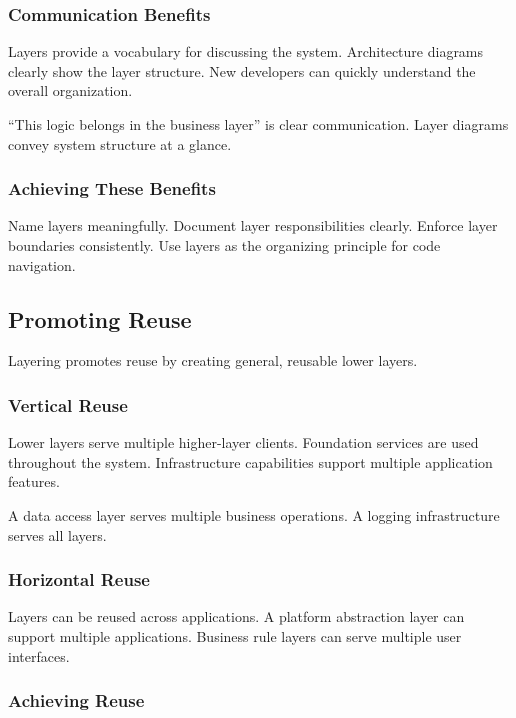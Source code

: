 \documentclass[11pt]{article}
\begin{document}
\subsubsection{Communication Benefits}

Layers provide a vocabulary for discussing the system. Architecture diagrams clearly show the layer structure. New developers can quickly understand the overall organization.

``This logic belongs in the business layer'' is clear communication. Layer diagrams convey system structure at a glance.

\subsubsection{Achieving These Benefits}

Name layers meaningfully. Document layer responsibilities clearly. Enforce layer boundaries consistently. Use layers as the organizing principle for code navigation.

\subsection{Promoting Reuse}

Layering promotes reuse by creating general, reusable lower layers.

\subsubsection{Vertical Reuse}

Lower layers serve multiple higher-layer clients. Foundation services are used throughout the system. Infrastructure capabilities support multiple application features.

A data access layer serves multiple business operations. A logging infrastructure serves all layers.

\subsubsection{Horizontal Reuse}

Layers can be reused across applications. A platform abstraction layer can support multiple applications. Business rule layers can serve multiple user interfaces.

\subsubsection{Achieving Reuse}
\end{document}
